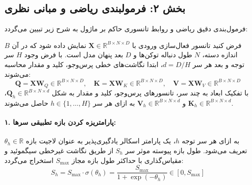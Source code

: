 \subsection*{بخش ۲: فرمولبندی ریاضی و مبانی نظری }
فرمول‌بندی دقیق ریاضی و روابط تانسوری حاکم بر ماژول  به شرح زیر تبیین می‌گردد:

فرض کنید تانسور فعال‌سازی ورودی با $\mathbf{X} \in \mathbb{R}^{B \times N \times D}$ نمایش داده شود که در آن $B$ اندازه دسته، $N$ طول دنباله توکن‌ها و $D$ بعد پنهان مدل است. با فرض وجود $H$ سر توجه و بعد هر سر $d = D / H$، ابتدا نگاشت‌های خطی پرس‌وجو، کلید و مقدار محاسبه می‌شوند:
\begin{equation}
\mathbf{Q} = \mathbf{X}\mathbf{W}_Q \in \mathbb{R}^{B \times N \times D}, \quad \mathbf{K} = \mathbf{X}\mathbf{W}_K \in \mathbb{R}^{B \times N \times D}, \quad \mathbf{V} = \mathbf{X}\mathbf{W}_V \in \mathbb{R}^{B \times N \times D}
\end{equation}
با تفکیک ابعاد به چند سر، تانسورهای پرس‌وجو، کلید و مقدار به شکل $\mathbf{Q}_h \in \mathbb{R}^{B \times N \times d}$، $\mathbf{K}_h \in \mathbb{R}^{B \times N \times d}$ و $\mathbf{V}_h \in \mathbb{R}^{B \times N \times d}$ به ازای هر سر $h \in \{1, \dots, H\}$ حاصل می‌شوند.

\paragraph{۱. پارامتریزه کردن بازه تطبیقی سرها:}
به ازای هر سر توجه $h$، یک پارامتر اسکالر یادگیری‌پذیر به عنوان لاجیت بازه $\theta_h \in \mathbb{R}$ تعریف می‌شود. طول بازه پیوسته موثر سر $S_h$ از طریق نگاشت غیرخطی سیگموئید و مقیاس‌گذاری با حداکثر طول بازه مجاز $S_{\max}$ استخراج می‌گردد:
\begin{equation}
S_h = S_{\max} \cdot \sigma(\theta_h) = \frac{S_{\max}}{1 + \exp(-\theta_h)} \in [0, S_{\max}]
\end{equation}

